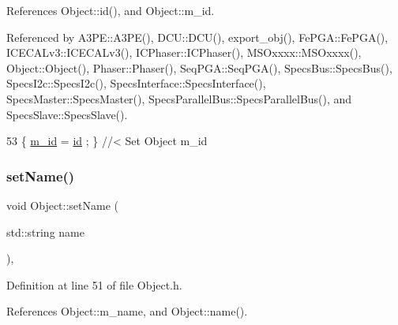 References Object\+::id(), and Object\+::m\+\_\+id.



Referenced by A3\+P\+E\+::\+A3\+P\+E(), D\+C\+U\+::\+D\+C\+U(), export\+\_\+obj(), Fe\+P\+G\+A\+::\+Fe\+P\+G\+A(), I\+C\+E\+C\+A\+Lv3\+::\+I\+C\+E\+C\+A\+Lv3(), I\+C\+Phaser\+::\+I\+C\+Phaser(), M\+S\+Oxxxx\+::\+M\+S\+Oxxxx(), Object\+::\+Object(), Phaser\+::\+Phaser(), Seq\+P\+G\+A\+::\+Seq\+P\+G\+A(), Specs\+Bus\+::\+Specs\+Bus(), Specs\+I2c\+::\+Specs\+I2c(), Specs\+Interface\+::\+Specs\+Interface(), Specs\+Master\+::\+Specs\+Master(), Specs\+Parallel\+Bus\+::\+Specs\+Parallel\+Bus(), and Specs\+Slave\+::\+Specs\+Slave().


\begin{DoxyCode}
53 \{ \hyperlink{classObject_aca74b9dbfed7b5556ea2d56c65b6b6b0}{m\_id}    = \hyperlink{classObject_af99145335cc61ff6e2798ea17db009d2}{id}    ; \} \textcolor{comment}{//< Set Object m\_id}
\end{DoxyCode}
\mbox{\label{classObject_ae30fea75683c2d149b6b6d17c09ecd0c}} 
\subsubsection{\texorpdfstring{set\+Name()}{setName()}}
{\footnotesize\ttfamily void Object\+::set\+Name (\begin{DoxyParamCaption}\item[{std\+::string}]{name }\end{DoxyParamCaption})\hspace{0.3cm}{\ttfamily [inline]}, {\ttfamily [inherited]}}



Definition at line 51 of file Object.\+h.



References Object\+::m\+\_\+name, and Object\+::name().



